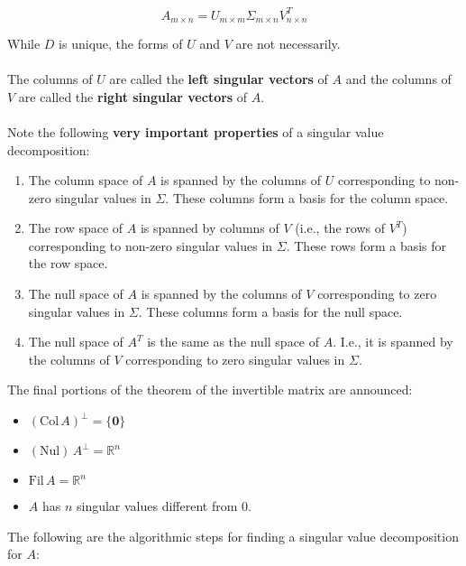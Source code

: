 \documentclass[12pt]{article}
\newcommand{\R}{\mathbb{R}}
\newcommand{\bt}[1]{\textbf{{#1}}}
\newcommand{\bm}[1]{\mathbf{{#1}}}
\newcommand{\set}[1]{\{{#1}\}}
\begin{document}
$$A_{m \times n} = U_{m \times m}\Sigma_{m \times n}V^T_{n \times n}$$

While $D$ is unique, the forms of $U$ and $V$ are not necessarily. \\ \\

The columns of $U$ are called the \bt{left singular vectors} of $A$ and the columns of $V$ are called the \bt{right singular vectors} of $A$. \\ \\

Note the following \bt{very important properties} of a singular value decomposition:

\begin{enumerate}
    \item The column space of $A$ is spanned by the columns of $U$ corresponding to non-zero singular values in $\Sigma$. These columns form a basis for the column space.
    \item The row space of $A$ is spanned by columns of $V$ (i.e., the rows of $V^T$) corresponding to non-zero singular values in $\Sigma$. These rows form a basis for the row space.
    \item The null space of $A$ is spanned by the columns of $V$ corresponding to zero singular values in $\Sigma$. These columns form a basis for the null space.
    \item The null space of $A^T$ is the same as the null space of $A$. I.e., it is spanned by the columns of $V$ corresponding to zero singular values in $\Sigma$.
\end{enumerate}

The final portions of the theorem of the invertible matrix are announced:

\begin{itemize}
    \item $(\textrm{Col}\,A)^\perp = \set{\bm{0}}$
    \item $(\textrm{Nul})\,A^\perp = \R^n$
    \item $\textrm{Fil}\,A = \R^n$
    \item $A$ has $n$ singular values different from $0$.
\end{itemize}

The following are the algorithmic steps for finding a singular value
decomposition for $A$:
\end{document}
